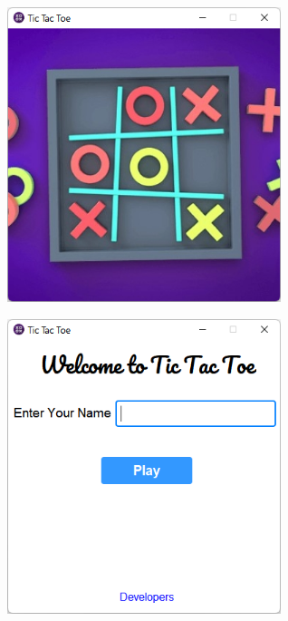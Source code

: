 \hspace{14pt}
\includegraphics[width=8cm, height=9cm]{figures/splash_page.png}
\hfill
\includegraphics[width=8cm, height=9cm]{figures/first_screen.png}

\vspace{15pt}

